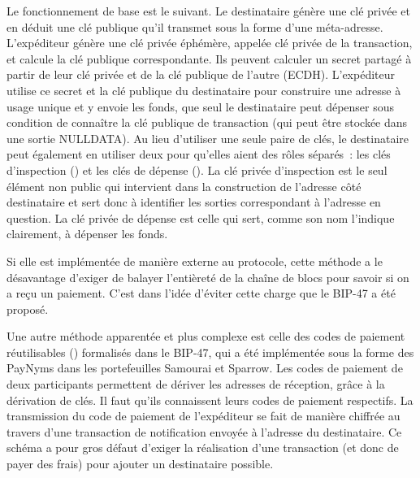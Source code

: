 Le fonctionnement de base est le suivant. Le destinataire génère une clé privée et en déduit une clé publique qu'il transmet sous la forme d'une méta-adresse. L'expéditeur génère une clé privée éphémère, appelée clé privée de la transaction, et calcule la clé publique correspondante. Ils peuvent calculer un secret partagé à partir de leur clé privée et de la clé publique de l'autre (ECDH). L'expéditeur utilise ce secret et la clé publique du destinataire pour construire une adresse à usage unique et y envoie les fonds, que seul le destinataire peut dépenser sous condition de connaître la clé publique de transaction (qui peut être stockée dans une sortie NULLDATA). Au lieu d'utiliser une seule paire de clés, le destinataire peut également en utiliser deux pour qu'elles aient des rôles séparés~: les clés d'inspection () et les clés de dépense (). La clé privée d'inspection est le seul élément non public qui intervient dans la construction de l'adresse côté destinataire et sert donc à identifier les sorties correspondant à l'adresse en question. La clé privée de dépense est celle qui sert, comme son nom l'indique clairement, à dépenser les fonds.

Si elle est implémentée de manière externe au protocole, cette méthode a le désavantage d'exiger de balayer l'entièreté de la chaîne de blocs pour savoir si on a reçu un paiement. C'est dans l'idée d'éviter cette charge que le BIP-47 a été proposé.


Une autre méthode apparentée et plus complexe est celle des codes de paiement réutilisables () formalisés dans le BIP-47, qui a été implémentée sous la forme des PayNyms dans les portefeuilles Samourai et Sparrow. Les codes de paiement de deux participants permettent de dériver les adresses de réception, grâce à la dérivation de clés. Il faut qu'ils connaissent leurs codes de paiement respectifs. La transmission du code de paiement de l'expéditeur se fait de manière chiffrée au travers d'une transaction de notification envoyée à l'adresse du destinataire. Ce schéma a pour gros défaut d'exiger la réalisation d'une transaction (et donc de payer des frais) pour ajouter un destinataire possible.

